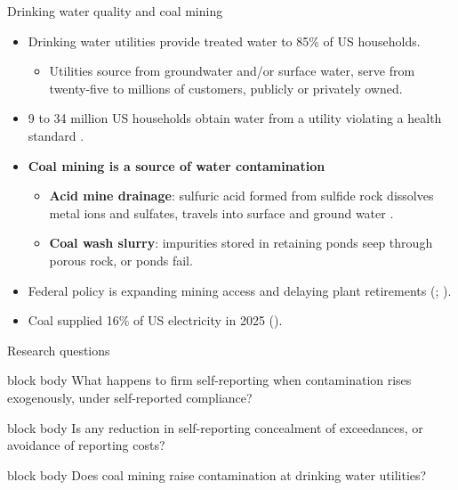 \documentclass{beamer}
\begin{document}
\begin{frame}{Drinking water quality and coal mining}
\begin{itemize}
    \item Drinking water utilities provide treated water to 85\% of US households.
    \begin{itemize}
        \item Utilities source from groundwater and/or surface water, serve from twenty-five to millions of customers, publicly or privately owned.
    \end{itemize}
    \item 9 to 34 million US households obtain water from a utility violating a health standard \parencite{allaire2018national}.
    \item \textbf{Coal mining is a source of water contamination} 
    \begin{itemize}
        \item \textbf{Acid mine drainage}: sulfuric acid formed from sulfide rock dissolves metal ions and sulfates, travels into surface and ground water \parencite{skousen2019acid}.
        \item \textbf{Coal wash slurry}: impurities stored in retaining ponds seep through porous rock, or ponds fail.
    \end{itemize}
    \item Federal policy is expanding mining access and delaying plant retirements (\cite{Trump2025EO14260}; \cite{Daly2025CoalMining}).
    \item Coal supplied 16\% of US electricity in 2025 (\cite{IEA2025GER}).
    \end{itemize}
\end{frame}

\begin{frame}{Research questions}
\begin{center}
\begin{beamercolorbox}[sep=10pt,center,rounded=true,shadow=true]{block body}
\large What happens to firm self-reporting when contamination rises exogenously, under self-reported compliance?
\end{beamercolorbox}
\end{center}

\begin{center}
\begin{beamercolorbox}[sep=10pt,center,rounded=true,shadow=true]{block body}
\large Is any reduction in self-reporting concealment of exceedances, or avoidance of reporting costs?
\end{beamercolorbox}
\end{center}

\begin{center}
\begin{beamercolorbox}[sep=10pt,center,rounded=true,shadow=true]{block body}
\large Does coal mining raise contamination at drinking water utilities?
\end{beamercolorbox}
\end{center}
\end{frame}
\end{document}
